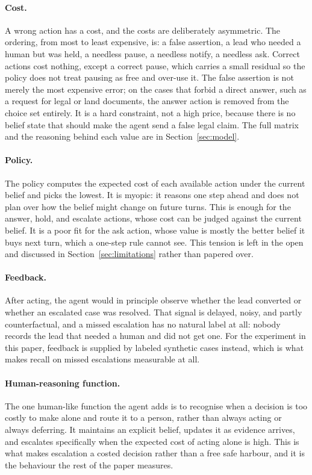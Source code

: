 \documentclass{article}
\begin{document}
\paragraph{Cost.} A wrong action has a cost, and the costs are deliberately
asymmetric. The ordering, from most to least expensive, is: a false assertion, a
lead who needed a human but was held, a needless pause, a needless notify, a
needless ask. Correct actions cost nothing, except a correct pause, which carries
a small residual so the policy does not treat pausing as free and over-use it.
The false assertion is not merely the most expensive error; on the cases that
forbid a direct answer, such as a request for legal or land documents, the answer
action is removed from the choice set entirely. It is a hard constraint, not a
high price, because there is no belief state that should make the agent send a
false legal claim. The full matrix and the reasoning behind each value are in
Section~\ref{sec:model}.

\paragraph{Policy.} The policy computes the expected cost of each available
action under the current belief and picks the lowest. It is myopic: it reasons
one step ahead and does not plan over how the belief might change on future turns.
This is enough for the answer, hold, and escalate actions, whose cost can be
judged against the current belief. It is a poor fit for the ask action, whose
value is mostly the better belief it buys next turn, which a one-step rule cannot
see. This tension is left in the open and discussed in
Section~\ref{sec:limitations} rather than papered over.

\paragraph{Feedback.} After acting, the agent would in principle observe whether
the lead converted or whether an escalated case was resolved. That signal is
delayed, noisy, and partly counterfactual, and a missed escalation has no natural
label at all: nobody records the lead that needed a human and did not get one. For
the experiment in this paper, feedback is supplied by labeled synthetic cases
instead, which is what makes recall on missed escalations measurable at all.

\paragraph{Human-reasoning function.} The one human-like function the agent adds
is to recognise when a decision is too costly to make alone and route it to a
person, rather than always acting or always deferring. It maintains an explicit
belief, updates it as evidence arrives, and escalates specifically when the
expected cost of acting alone is high. This is what makes escalation a costed
decision rather than a free safe harbour, and it is the behaviour the rest of the
paper measures.
\end{document}
